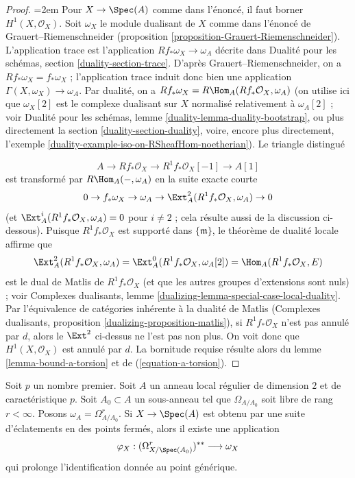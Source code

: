 \begin{proof} \begingroup\emergencystretch=2em
Pour $X \to \Spec(A)$ comme dans l'énoncé, il faut borner $H^1(X, \mathcal{O}_X)$. Soit $\omega_X$ le module dualisant de $X$ comme dans l'énoncé de Grauert--Riemenschneider (proposition \ref{proposition-Grauert-Riemenschneider}). L'application trace est l'application $Rf_*\omega_X \to \omega_A$ décrite dans Dualité pour les schémas, section \ref{duality-section-trace}. D'après Grauert--Riemenschneider, on a $Rf_*\omega_X = f_*\omega_X$ ; l'application trace induit donc bien une application $\Gamma(X, \omega_X) \to \omega_A$. Par dualité, on a $Rf_*\omega_X = R\Hom_A(Rf_*\mathcal{O}_X, \omega_A)$ (on utilise ici que $\omega_X[2]$ est le complexe dualisant sur $X$ normalisé relativement à $\omega_A[2]$ ; voir Dualité pour les schémas, lemme \ref{duality-lemma-duality-bootstrap}, ou plus directement la section \ref{duality-section-duality}, voire, encore plus directement, l'exemple \ref{duality-example-iso-on-RSheafHom-noetherian}). Le triangle distingué\par\endgroup
$$
A \to Rf_*\mathcal{O}_X \to R^1f_*\mathcal{O}_X[-1] \to A[1]
$$ est transformé par $R\Hom_A(-, \omega_A)$ en la suite exacte courte $$
0 \to f_*\omega_X \to \omega_A \to
\Ext_A^2(R^1f_*\mathcal{O}_X, \omega_A) \to 0
$$ (et $\Ext_A^i(R^1f_*\mathcal{O}_X, \omega_A) = 0$ pour $i \not = 2$ ; cela résulte aussi de la discussion ci-dessous). Puisque $R^1f_*\mathcal{O}_X$ est supporté dans $\{\mathfrak m\}$, le théorème de dualité locale affirme que $$
\Ext_A^2(R^1f_*\mathcal{O}_X, \omega_A) =
\Ext_A^0(R^1f_*\mathcal{O}_X, \omega_A[2]) =
\Hom_A(R^1f_*\mathcal{O}_X, E)
$$ est le dual de Matlis de $R^1f_*\mathcal{O}_X$ (et que les autres groupes d'extensions sont nuls) ; voir Complexes dualisants, lemme \ref{dualizing-lemma-special-case-local-duality}. Par l'équivalence de catégories inhérente à la dualité de Matlis (Complexes dualisants, proposition \ref{dualizing-proposition-matlis}), si $R^1f_*\mathcal{O}_X$ n'est pas annulé par $d$, alors le $\Ext^2$ ci-dessus ne l'est pas non plus. On voit donc que $H^1(X, \mathcal{O}_X)$ est annulé par $d$. La bornitude requise résulte alors du lemme \ref{lemma-bound-a-torsion} et de (\ref{equation-a-torsion}). \end{proof}

\begin{lemma} \label{lemma-compare-differentials-dualizing} Soit $p$ un nombre premier. Soit $A$ un anneau local régulier de dimension $2$ et de caractéristique $p$. Soit $A_0 \subset A$ un sous-anneau tel que $\Omega_{A/A_0}$ soit libre de rang $r < \infty$. Posons $\omega_A = \Omega^r_{A/A_0}$. Si $X \to \Spec(A)$ est obtenu par une suite d'éclatements en des points fermés, alors il existe une application $$
\varphi_X : (\Omega^r_{X/\Spec(A_0)})^{**} \longrightarrow \omega_X
$$ qui prolonge l'identification donnée au point générique. \end{lemma}

